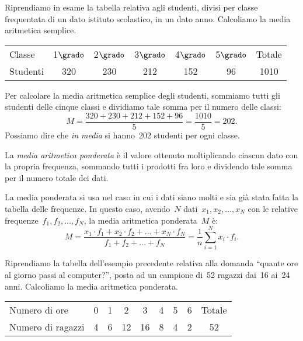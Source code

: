  \begin{esempio}

Riprendiamo in esame la tabella relativa agli studenti, divisi per classe 
frequentata di un dato istituto scolastico, in un dato anno. Calcoliamo la 
media aritmetica semplice.
\begin{center}
 \begin{tabular}{lcccccc}
 \toprule
 Classe & 1\(\grado\) & 2\(\grado\) & 3\(\grado\) & 4\(\grado\) & 5\(\grado\) & 
Totale\\
 Studenti & 320 & 230 & 212 & 152 & 96 & 1010\\
 \bottomrule
\end{tabular}
\end{center}
Per calcolare la media aritmetica semplice degli studenti, sommiamo tutti 
gli studenti delle cinque classi e dividiamo tale somma per il numero delle 
classi:
\begin{equation*}
M=\frac{320+230+212+152+96}{5}= \frac{1010}{5}= 202.
\end{equation*}
Possiamo dire che \emph{in media} si hanno~202 studenti per ogni classe.

\begin{definizione}
La \emph{media aritmetica ponderata} è il valore ottenuto moltiplicando 
ciascun dato con la propria
frequenza, sommando tutti i prodotti fra loro e dividendo tale somma per il 
numero totale dei dati.
\end{definizione}

La media ponderata si usa nel caso in cui i dati siano molti e sia già 
stata fatta la tabella delle frequenze. In questo caso,
avendo~\(N\) dati~\(x_1, x_2, \ldots, x_N\) con le relative 
frequenze~\(f_1, f_2, \ldots, f_N\), la media aritmetica ponderata~\(M\) è:
\begin{equation*}
M=\frac{x_1\cdot f_1+x_2\cdot f_2+ \dots +x_N\cdot f_N}
       {f_1+f_2+ \dots +f_N}=\frac{1}{n}\sum_{i=1}^N x_i\cdot f_i.
\end{equation*}
 \begin{esempio}

Riprendiamo la tabella dell'esempio precedente relativa alla domanda 
``quante ore al giorno passi al computer?'',
posta ad un campione di~52 ragazzi dai~16 ai~24 anni. Calcoliamo la media 
aritmetica ponderata.

\begin{center}
 \begin{tabular}{lcccccccc}
 \toprule
 Numero di ore & 0 & 1 & 2 & 3 & 4 & 5 & 6 & Totale\\
 Numero di ragazzi & 4 & 6 & 12 & 16 & 8 & 4 & 2 & 52\\
 \bottomrule
\end{tabular}
\end{center}


\end{esempio}
\end{esempio}
